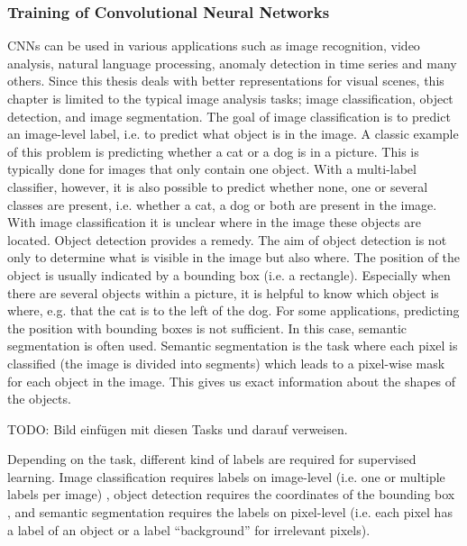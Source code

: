 \subsubsection{Training of Convolutional Neural Networks}
CNNs can be used in various applications such as image recognition, video analysis, natural language processing, anomaly detection in time series and many others.
Since this thesis deals with better representations for visual scenes, this chapter is limited to the typical image analysis tasks; image classification, object detection, and image segmentation.
The goal of image classification is to predict an image-level label, i.e. to predict what object is in the image.
A classic example of this problem is predicting whether a cat or a dog is in a picture.
This is typically done for images that only contain one object.
With a multi-label classifier, however, it is also possible to predict whether none, one or several classes are present, i.e. whether a cat, a dog or both are present in the image.
With image classification it is unclear where in the image these objects are located.
Object detection provides a remedy.
The aim of object detection is not only to determine what is visible in the image but also where.
The position of the object is usually indicated by a bounding box (i.e. a rectangle).
Especially when there are several objects within a picture, it is helpful to know which object is where, e.g. that the cat is to the left of the dog.
For some applications, predicting the position with bounding boxes is not sufficient.
In this case, semantic segmentation is often used.
Semantic segmentation is the task where each pixel is classified (the image is divided into segments) which leads to a pixel-wise mask for each object in the image.
This gives us exact information about the shapes of the objects.

TODO: Bild einfügen mit diesen Tasks und darauf verweisen.


Depending on the task, different kind of labels are required for supervised learning.
Image classification requires labels on image-level (i.e. one or multiple labels per image) \cite{Lecun_Bottou_Bengio_Haffner_1998, NIPS2012_c399862d, Simonyan_Zisserman_2015, Szegedy_Liu_Jia_Sermanet_Reed_Anguelov_Erhan_Vanhoucke_Rabinovich_2014, He_Zhang_Ren_Sun_2016}, object detection requires the coordinates of the bounding box \cite{Redmon_Divvala_Girshick_Farhadi_2016, Liu_Anguelov_Erhan_Szegedy_Reed_Fu_Berg_2016, He_Gkioxari_Dollar_Girshick_2017}, and semantic segmentation requires the labels on pixel-level \cite{Ronneberger_Fischer_Brox_2015, Wu_Zhang_Huang_Liang_Yu_2019} (i.e. each pixel has a label of an object or a label ``background'' for irrelevant pixels).

